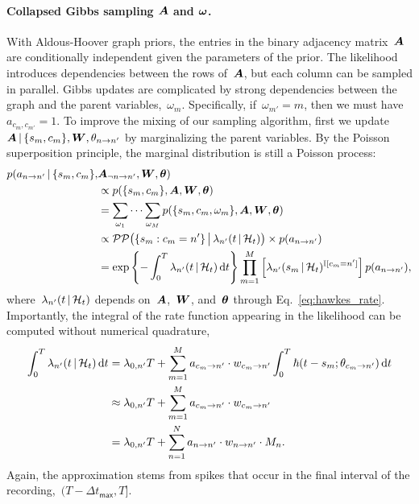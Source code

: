 \paragraph{Collapsed Gibbs sampling $\boldsymbol{A}$ and $\boldsymbol{\omega}$.}
With Aldous-Hoover graph priors, the entries in the binary adjacency
matrix~$\boldsymbol{A}$ are conditionally independent given the parameters of the
prior. The likelihood introduces dependencies between the rows
of~$\boldsymbol{A}$, but each column can be sampled in parallel. Gibbs updates
are complicated by strong dependencies between the graph and the
parent variables,~$\omega_m$. Specifically, if~${\omega_{m'}=m}$, then
we must have~${a_{c_{m},c_{m'}}=1}$. To improve the mixing of our
sampling algorithm, first we
update~${\boldsymbol{A}\,|\,\{s_m,c_m\},\boldsymbol{W},\theta_{n \to n'}}$ by marginalizing
the parent variables. By the Poisson superposition principle, the marginal
distribution is still a Poisson process:
\begin{align*}
  p(a_{n \to n'} \,|\, \{s_m, c_m\}, &\boldsymbol{A}_{\neg n \to n'}, \boldsymbol{W}, \boldsymbol{\theta}) \\
  &\propto p(\{s_m, c_m\}, \boldsymbol{A}, \boldsymbol{W}, \boldsymbol{\theta}) \\
  &= \sum_{\omega_1} \cdots \sum_{\omega_M} p(\{s_m, c_m, \omega_m\}, \boldsymbol{A}, \boldsymbol{W}, \boldsymbol{\theta}) \\
  &\propto \mathcal{PP} \big(\{s_m: c_m=n'\} \, \big| \, \lambda_{n'}(t \,|\, \mathcal{H}_t)\big)
  \times p(a_{n \to n'}) \\
  &= \exp \left \{ -\int_0^T \lambda_{n'}(t \,|\, \mathcal{H}_t) \, \mathrm{d}t \right\}
  \prod_{m=1}^M \left[ \lambda_{n'}(s_m \,|\, \mathcal{H}_t)^{\mathbb{I}[c_m=n']} \right]
  p(a_{n \to n'}),
\end{align*}
where~$\lambda_{n'}(t \,|\, \mathcal{H}_t)$ depends on~$\boldsymbol{A}$,~$\boldsymbol{W}$, and~$\boldsymbol{\theta}$
through Eq.~\ref{eq:hawkes_rate}.
Importantly, the integral of the rate function appearing in the
likelihood can be computed without numerical quadrature,
\begin{align*}
  \int_0^T \lambda_{n'}(t \,|\, \mathcal{H}_t) \, \mathrm{d}t
  &= \lambda_{0,n'} T +
  \sum_{m=1}^M a_{c_m \to n'} \cdot w_{c_m \to n'}
  \int_0^T  \hbar(t-s_m; \theta_{c_m \to n'}) \, \mathrm{d}t \\
  &\approx \lambda_{0,n'} T + \sum_{m=1}^M a_{c_m \to n'} \cdot w_{c_m \to n'} \\
  &= \lambda_{0,n'} T + \sum_{n=1}^N a_{n \to n'} \cdot w_{n \to n'} \cdot M_{n}.
\end{align*}
Again, the approximation stems from spikes that occur in the final
interval of the recording,~${(T-\Delta t_{\mathsf{max}}, T]}$.

